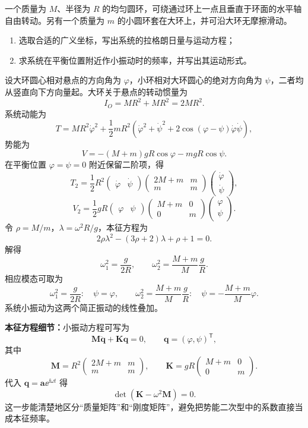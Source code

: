 \begin{question}[匀质环与小圆环]
一个质量为 $M$、半径为 $R$ 的均匀圆环，可绕通过环上一点且垂直于环面的水平轴自由转动。另有一个质量为 $m$ 的小圆环套在大环上，并可沿大环无摩擦滑动。
\begin{enumerate}
  \item 选取合适的广义坐标，写出系统的拉格朗日量与运动方程；
  \item 求系统在平衡位置附近作小振动时的频率，并写出其运动形式。
\end{enumerate}

\begin{solution}
设大环圆心相对悬点的方向角为 $\varphi$，小环相对大环圆心的绝对方向角为 $\psi$，二者均从竖直向下方向量起。大环关于悬点的转动惯量为
\[
  I_O=MR^2+MR^2=2MR^2.
\]
系统动能为
\[
  T=MR^2\dot\varphi^2+\frac12mR^2
  \left(\dot\varphi^2+\dot\psi^2+2\cos(\varphi-\psi)\dot\varphi\dot\psi\right),
\]
势能为
\[
  V=-(M+m)gR\cos\varphi-mgR\cos\psi.
\]
在平衡位置 $\varphi=\psi=0$ 附近保留二阶项，得
\[
  T_2=\frac12R^2
  \begin{pmatrix}\dot\varphi&\dot\psi\end{pmatrix}
  \begin{pmatrix}2M+m&m\\m&m\end{pmatrix}
  \begin{pmatrix}\dot\varphi\\\dot\psi\end{pmatrix},
\]
\[
  V_2=\frac12gR
  \begin{pmatrix}\varphi&\psi\end{pmatrix}
  \begin{pmatrix}M+m&0\\0&m\end{pmatrix}
  \begin{pmatrix}\varphi\\\psi\end{pmatrix}.
\]
令 $\rho=M/m$，$\lambda=\omega^2R/g$，本征方程为
\[
  2\rho\lambda^2-(3\rho+2)\lambda+\rho+1=0.
\]
解得
\[
  \boxed{\omega_1^2=\frac{g}{2R}},
  \qquad
  \boxed{\omega_2^2=\frac{M+m}{M}\frac{g}{R}}.
\]
相应模态可取为
\[
  \omega_1^2=\frac{g}{2R}:\quad \psi=\varphi,
  \qquad
  \omega_2^2=\frac{M+m}{M}\frac{g}{R}:\quad \psi=-\frac{M+m}{M}\varphi.
\]
系统小振动为这两个简正振动的线性叠加。


\medskip
\textbf{本征方程细节：}小振动方程可写为
\[
  \mathbf M\ddot{\boldsymbol q}+\mathbf K\boldsymbol q=0,
  \qquad
  \boldsymbol q=(\varphi,\psi)^{\mathsf T},
\]
其中
\[
  \mathbf M=R^2\begin{pmatrix}2M+m&m\\m&m\end{pmatrix},
  \qquad
  \mathbf K=gR\begin{pmatrix}M+m&0\\0&m\end{pmatrix}.
\]
代入 $\boldsymbol q=\boldsymbol a\ee^{\ii\omega t}$ 得
\[
  \det(\mathbf K-\omega^2\mathbf M)=0.
\]
这一步能清楚地区分“质量矩阵”和“刚度矩阵”，避免把势能二次型中的系数直接当成本征频率。
\end{solution}
\end{question}
